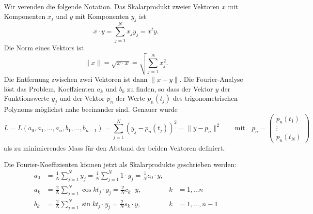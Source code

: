 Wir verenden die folgende Notation.
Das Skalarprodukt zweier Vektoren $x$ mit Komponenten $x_j$ und $y$ mit
%
Komponenten $y_j$ ist
\begin{equation}
x\cdot y
=
\sum_{j=1}^N x_jy_j
=
x^ty.
\end{equation}
Die Norm eines Vektors ist
%
\begin{equation}
\| x\| = \sqrt{x\cdot x} = \sqrt{\sum_{j=1}^N x_j^2}.
\end{equation}
Die Entfernung zwischen zwei Vektoren ist dann $\| x-y\|$.
Die Fourier-Analyse löst das Problem, Koeffzienten $a_k$ und $b_k$
zu finden, so dass der Vektor $y$ der Funktionswerte $y_j$ und
der Vektor $p_n$ der Werte $p_n(t_j)$ des trigonometrischen Polynoms
möglichst nahe beeinander sind.
Genauer wurde 
\begin{equation}
L=L(a_0,a_1,\dots,a_n,b_1,\dots,b_{n-1})
=
\sum_{j=1}^N (y_j - p_n(t_j))^2
=
\| y - p_n\|^2
\qquad\text{mit}\quad
p_n=\begin{pmatrix}
p_n(t_1)\\\vdots\\p_n(t_N)
\end{pmatrix}
\end{equation}
als zu minimierendes Mass für den Abstand der beiden Vektoren
definiert.

Die Fourier-Koeffizienten können jetzt als Skalarprodukte geschrieben werden:
\begin{align*}
a_0
&=
\frac1N\sum_{j=1}^N y_j
=
\frac1N\sum_{j=1}^N 1\cdot y_j 
=
\frac1N c_0\cdot y,
\\
a_k
&=
\frac{2}{N}\sum_{j=1}^N
\cos kt_j \cdot y_j
=
\frac2N c_k\cdot y,
&k&=1,\dots n
\\
b_k
&=
\frac2N \sum_{j=1}^N \sin kt_j \cdot y_j
=
\frac2N s_k\cdot y,&k&=1,\dots,n-1
\end{align*}

